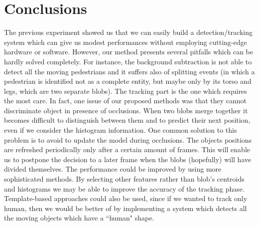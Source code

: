 \documentclass[runningheads]{llncs}
\begin{document}
\section{Conclusions}

The previous experiment showed us that we can easily build a detection/tracking system which can give us modest performances without employing cutting-edge hardware or software. However, our method presents several pitfalls which can be hardly solved completely. For instance, the background subtraction is not able to detect all the moving pedestrians and it suffers also of splitting events (in which a pedestrian is identified not as a complete entity, but maybe only by its torso and legs, which are two separate blobs). 
 The tracking part is the one which requires the most care. In fact, one issue of our proposed methods was that they cannot discriminate object in presence of occlusions. When two blobs merge together it becomes difficult to distinguish between them and to predict their next position, even if we consider the histogram information. One common solution to this problem is to avoid to update the model during occlusions. The objects positions are refreshed periodically only after a certain amount of frames. This will enable us to postpone the decision to a later frame when the blobs (hopefully) will have divided themselves.
The performance could be improved by using more sophisticated methods. 
By selecting other features rather than blob's centroids and histograms we may be able to improve the accuracy of the tracking phase. Template-based approaches could also be used, since if we wanted to track only human, then we would be better of by implementing a system which detects all the moving objects which have a ``human" shape.

%
%
%
%
%
% 
% 
%





\end{document}
